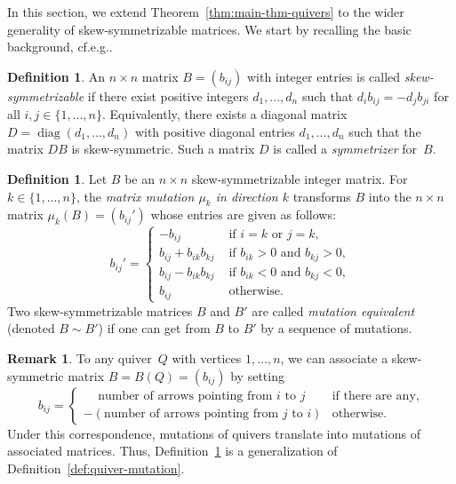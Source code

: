 \documentclass[10pt]{amsart}
\theoremstyle{definition}
\newtheorem{definition}[theorem]{Definition}
\newtheorem{remark}[theorem]{Remark}
\newcommand{\cf}{cf.}
\newcommand{\eg}{e.g.}
\DeclareMathOperator{\diag}{diag}
\begin{document}
In this section, we extend Theorem~\ref{thm:main-thm-quivers} to the wider generality of skew-sym\-met\-rizable matrices. 
We start by recalling the basic background, \cf \eg \cite[Section~2.7]{FWZ}. 

\begin{definition} 
An $n \times n$ matrix $B = (b_{ij})$ with integer entries is called
\emph{skew-symmetrizable} if there exist positive integers $d_1,..., d_n$ such that $d_ib_{ij} = -d_j b_{ji}$ for all $i,j\in\{1,\dots,n\}$. 
Equivalently, there exists a diagonal matrix $D=\diag(d_1,\dots,d_n)$ with positive diagonal entries $d_1,...,d_n$ such that the matrix $DB$ is skew-symmetric. Such a matrix $D$ is called a \emph{symmetrizer} for~$B$. 
\end{definition}

\begin{definition} 
\label{def:matrix-mutation}
Let $B$ be an $n \times n$ skew-symmetrizable
integer matrix. 
For $k\in\{1,...,n\}$, the \emph{matrix mutation $\mu_k$ in direction $k$} transforms $B$ into
the $n \times n$ matrix $\mu_k(B)=(b_{ij}')$ whose entries are given as follows:
\begin{equation}
\label{eq:matrix-mutation}
b_{ij}'=
\begin{cases} -b_{ij} &\text{ if }i=k\text{ or }j=k, \\
b_{ij}+b_{ik}b_{kj} &\text{ if }b_{ik}>0\text{ and }b_{kj}>0,\\
b_{ij}-b_{ik}b_{kj} &\text{ if }b_{ik}<0\text{ and }b_{kj}<0,\\ 
b_{ij} &\text{ otherwise.} 
\end{cases}
\end{equation}
Two skew-symmetrizable matrices $B$ and $B'$ are called \emph{mutation
equivalent} (denoted \hbox{$B\sim B'$}) if one can get from $B$ to $B'$ by a sequence of mutations.
\end{definition}

\begin{remark}
To any quiver~$Q$ with vertices $1,\dots,n$, we can associate a skew-symmetric matrix $B=B(Q)=(b_{ij})$ by setting
\[
b_{ij}=\begin{cases}
\quad \, \text{number of arrows pointing from $i$ to~$j$} &\text{if there are any,}\\
-(\text{number of arrows pointing from $j$ to~$i$}) &\text{otherwise.}
\end{cases}
\]
Under this correspondence, mutations of quivers translate into mutations of associated matrices. Thus, Definition~\ref{def:matrix-mutation} is a generalization of Definition~\ref{def:quiver-mutation}. 
\end{remark}
\end{document}
